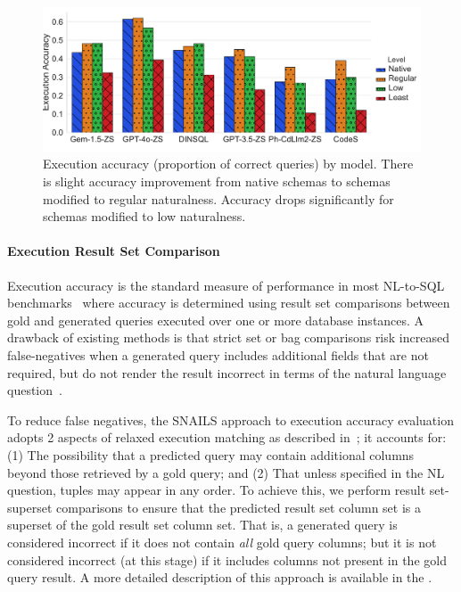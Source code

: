 \begin{figure}
  \centering
  \includegraphics[width=\figwidthmod\linewidth]{figures/execution-accuracy-barplot.pdf}
  \caption{Execution accuracy (proportion of correct queries) by model. There is slight accuracy improvement from native schemas to schemas modified to regular naturalness. Accuracy drops significantly for schemas modified to low naturalness.}
  \label{fig:execution-accuracy-barplot}
\end{figure}

\paragraph{\textbf{Execution Result Set Comparison}}
Execution accuracy is the standard measure of performance in most NL-to-SQL benchmarks~\cite{li2023llm, Yu&al.18c} where accuracy is determined using result set comparisons between gold and generated queries executed over one or more database instances.
A drawback of existing methods is that strict set or bag comparisons risk increased false-negatives when a generated query includes additional fields that are not required, but do not render the result incorrect in terms of the natural language question~\cite{10023434, floratou2024nl2sql}.

To reduce false negatives, the SNAILS approach to execution accuracy evaluation adopts 2 aspects of relaxed execution matching as described in~\cite{floratou2024nl2sql}; it accounts for: (1) The possibility that a predicted query may contain additional columns beyond those retrieved by a gold query; and (2) That unless specified in the NL question, tuples may appear in any order.
To achieve this, we perform result set-superset comparisons to ensure that the predicted result set column set is a superset of the gold result set column set.
That is, a generated query is considered incorrect if it does not contain \emph{all} gold query columns; but it is not considered incorrect (at this stage) if it includes columns not present in the gold query result. 
A more detailed description of this approach is available in the \fi.

